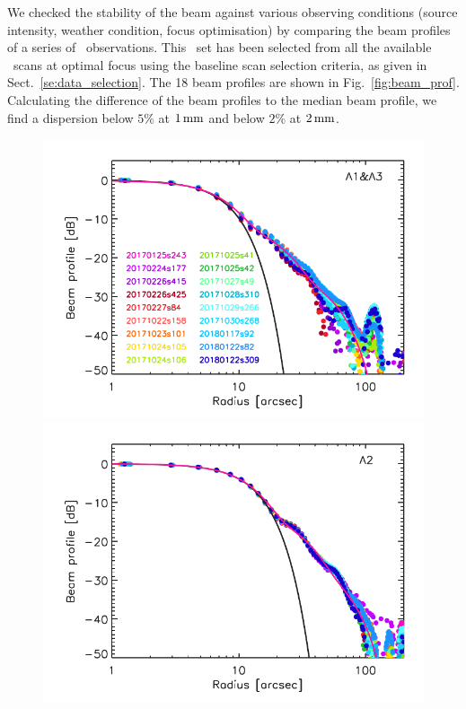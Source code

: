 We checked the stability of the beam against various observing
conditions (source intensity, weather condition, focus optimisation) by
comparing the beam profiles of a series of \bm\ observations.
This \bm\ set has been selected from all the available \bm\ scans at
optimal focus using the baseline scan selection criteria, as given in
Sect.~\ref{se:data_selection}.
The 18 beam profiles are shown in
Fig.~\ref{fig:beam_prof}. Calculating the difference of the beam
profiles to the median beam profile, we find a dispersion below $5\%$ at
$1\,\rm{mm}$ and below $2\%$ at $2\,\rm{mm}$. 

\begin{figure}[!thbp]
  \centering
   \includegraphics[clip, width=\linewidth]{Figures/plot_profiles_dB_1mm.pdf}
   \includegraphics[clip, width=\linewidth]{Figures/plot_profiles_dB_a2.pdf}

\end{figure}
